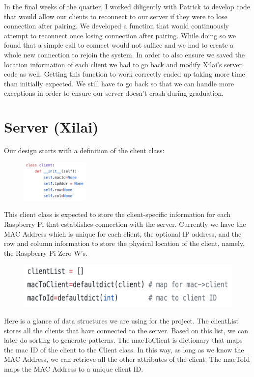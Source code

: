 \documentclass[a4paper,10pt]{article}
\begin{document}
    In the final weeks of the quarter, I worked diligently with Patrick to develop code that would allow our clients to reconnect to our server if they were to lose connection after pairing. We developed a function that would continuously attempt to reconnect once losing connection after pairing. While doing so we found that a simple call to connect would not suffice and we had to create a whole new connection to rejoin the system.  In order to also ensure we saved the location information of each client we had to go back and modify Xilai's server code as well. Getting this function to work correctly ended up taking more time than initially expected. We still have to go back so that we can handle more exceptions in order to ensure our server doesn't crash during graduation.

\section{Server (Xilai)}
Our design starts with a definition of the client class:
\begin{figure}[H]
  \centering
      \includegraphics[width=0.3\textwidth]{Assets/client_class.png}
\end{figure}

This client class is expected to store the client-specific information for each Raspberry Pi that establishes connection with the server. Currently we have the MAC Address which is unique for each client, the optional IP address, and the row and column information to store the physical location of the client, namely, the Raspberry Pi Zero W's.

\begin{figure}[H]
  \centering
      \includegraphics[width=\textwidth]{Assets/client_list.png}
\end{figure}

Here is a glance of data structures we are using for the project. The clientList stores all the clients that have connected to the server. Based on this list, we can later do sorting to generate patterns. The macToClient is dictionary that maps the mac ID of the client to the Client class. In this way, as long as we know the MAC Address, we can retrieve all the other attributes of the client. The macToId maps the MAC Address to a unique client ID. 
\end{document}

